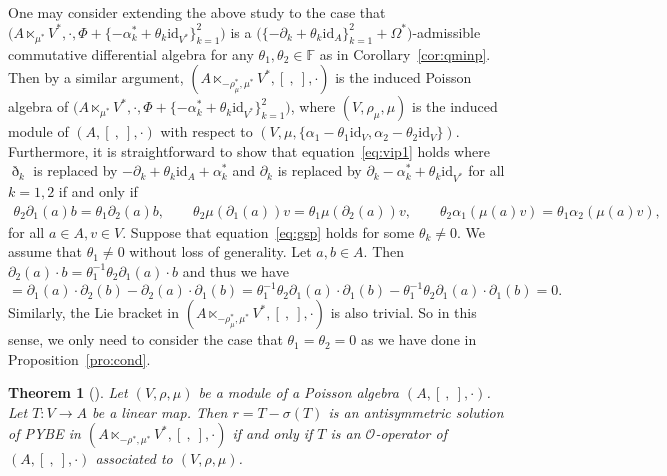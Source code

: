 \documentclass[10pt,a4paper]{amsart}
\numberwithin{equation}{section}
\newtheorem{Theorem}{Theorem}[section]
\newcommand{\id}{\mathrm{id}}
\begin{document}
\begin{Remark}One may consider extending the above study to the case that
$\big(A \ltimes_{\mu^*} V^*, \cdot, \Phi + \{-\alpha_k^* + \theta_k\id_{V^*}\}_{k=1}^2\big)$ is a $\big(\{-\partial_k + \theta_k \id_A\}_{k=1}^2 + \Omega^*\big)$-admissible commutative differential algebra for any $\theta_1,\theta_2\in \mathbb F$ as in Corollary~\ref{cor:qminp}.
Then by a similar argument,
$(A \ltimes_{-\rho_\mu^*, \mu^*} V^*, [\ ,\ ], \cdot)$ is the induced Poisson algebra of $\big(A \ltimes_{\mu^*} V^*, \cdot, \Phi+\{-\alpha_k^* + \theta_k\id_{V^*}\}_{k=1}^2\big)$,
where $(V, \rho_\mu, \mu)$ is the induced module of $(A, [\ ,\ ], \cdot)$ with respect to $(V, \mu, \{\alpha_1 - \theta_1 \id_V, \alpha_2 - \theta_2 \id_V \})$.
Furthermore, it is straightforward to show that equation~\eqref{eq:vip1} holds
where $\eth_k$ is replaced by $-\partial_k + \theta_k \id_{A} + \alpha_k^*$ and $\partial_k$ is replaced by $\partial_k - \alpha_k^* + \theta_k \id_{V^*}$ for all $k = 1, 2$
if and only if
\begin{gather}
 \theta_2 \partial_1(a)b = \theta_1 \partial_2(a)b, \qquad\!
 \theta_2 \mu(\partial_1(a))v = \theta_1\mu(\partial_2(a))v, \qquad\!
 \theta_2 \alpha_1(\mu(a)v) = \theta_1 \alpha_2(\mu(a)v),\!\!\!\! \label{eq:gsp}
\end{gather}
for all $a \in A, v \in V$.
Suppose that equation~\eqref{eq:gsp} holds for some $\theta_k \neq 0$.
We assume that $\theta_1 \neq 0$ without loss of generality.
Let $a, b \in A$.
Then $\partial_2(a) \cdot b = \theta_1^{-1} \theta_2 \partial_1(a) \cdot b$ and thus we have
\begin{equation*}
 [a, b] = \partial_1(a) \cdot \partial_2(b) - \partial_2(a) \cdot
 \partial_1(b)
 = \theta_1^{-1} \theta_2 \partial_1(a) \cdot \partial_1(b) - \theta_1^{-1} \theta_2 \partial_1(a) \cdot \partial_1(b) = 0.
\end{equation*}
Similarly, the Lie bracket in $(A \ltimes_{-\rho_\mu^*, \mu^*} V^*, [\ ,\ ], \cdot)$ is also trivial.
So in this sense, we only need to consider the case that $\theta_1 = \theta_2 = 0$ as we have done in Proposition~\ref{pro:cond}.
\end{Remark}

\begin{Theorem}[{\cite[Theorem~5.24]{liu2020noncommutative}}]\label{thm:oopsemi}
Let $(V, \rho, \mu)$ be a module of a Poisson algebra $(A, [\ ,\ ], \cdot)$.
 Let $T\colon V \to A$ be a linear map. Then $r = T - \sigma(T)$ is an antisymmetric solution of PYBE in $(A \ltimes_{-\rho^*, \mu^*} V^*, [\ ,\ ], \cdot)$ if and only if
 $T$ is an $\mathcal{O}$-operator of $(A, [\ ,\ ], \cdot)$ associated to $(V, \rho, \mu)$.
\end{Theorem}
\end{document}
